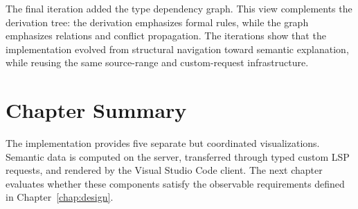 The final iteration added the type dependency graph. This view complements the derivation tree: the derivation emphasizes formal rules, while the graph emphasizes relations and conflict propagation. The iterations show that the implementation evolved from structural navigation toward semantic explanation, while reusing the same source-range and custom-request infrastructure.

\section{Chapter Summary}

The implementation provides five separate but coordinated visualizations. Semantic data is computed on the server, transferred through typed custom LSP requests, and rendered by the Visual Studio Code client. The next chapter evaluates whether these components satisfy the observable requirements defined in Chapter~\ref{chap:design}.



